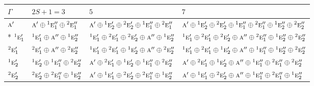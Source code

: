 \documentclass[10pt,a4paper]{article}
\numberwithin{equation}{section}
\newcommand{\irr}[1]{\text{\normalfont\scshape #1}}
\newcommand{\conjpair}[1]{{}^{#1}}
\begin{document}
{\small\setlength{\tabcolsep}{3pt}\begin{longtable}{@{}l>{\RaggedRight\arraybackslash}p{}>{\RaggedRight\arraybackslash}p{}>{\RaggedRight\arraybackslash}p{}@{}}\toprule
$\Gamma$ & $2S + 1 = 3$ & $5$ & $7$\\\midrule\endhead
\bottomrule\endfoot\endlastfoot
$\irr{a}'$ & $\irr{a}'\oplus \conjpair{1}\irr{e}_{1}''\oplus \conjpair{2}\irr{e}_{1}''$ & $\irr{a}'\oplus \conjpair{1}\irr{e}_{2}'\oplus \conjpair{2}\irr{e}_{2}'\oplus \conjpair{1}\irr{e}_{1}''\oplus \conjpair{2}\irr{e}_{1}''$ & $\irr{a}'\oplus \conjpair{1}\irr{e}_{2}'\oplus \conjpair{2}\irr{e}_{2}'\oplus \conjpair{1}\irr{e}_{1}''\oplus \conjpair{2}\irr{e}_{1}''\oplus \conjpair{1}\irr{e}_{2}''\oplus \conjpair{2}\irr{e}_{2}''$\\*
$\conjpair{1}\irr{e}_{1}'$ & $\conjpair{1}\irr{e}_{1}'\oplus \irr{a}''\oplus \conjpair{1}\irr{e}_{2}''$ & $\conjpair{1}\irr{e}_{1}'\oplus \conjpair{2}\irr{e}_{1}'\oplus \conjpair{2}\irr{e}_{2}'\oplus \irr{a}''\oplus \conjpair{1}\irr{e}_{2}''$ & $\conjpair{1}\irr{e}_{1}'\oplus \conjpair{2}\irr{e}_{1}'\oplus \conjpair{2}\irr{e}_{2}'\oplus \irr{a}''\oplus \conjpair{2}\irr{e}_{1}''\oplus \conjpair{1}\irr{e}_{2}''\oplus \conjpair{2}\irr{e}_{2}''$\\
$\conjpair{2}\irr{e}_{1}'$ & $\conjpair{2}\irr{e}_{1}'\oplus \irr{a}''\oplus \conjpair{2}\irr{e}_{2}''$ & $\conjpair{1}\irr{e}_{1}'\oplus \conjpair{2}\irr{e}_{1}'\oplus \conjpair{1}\irr{e}_{2}'\oplus \irr{a}''\oplus \conjpair{2}\irr{e}_{2}''$ & $\conjpair{1}\irr{e}_{1}'\oplus \conjpair{2}\irr{e}_{1}'\oplus \conjpair{1}\irr{e}_{2}'\oplus \irr{a}''\oplus \conjpair{1}\irr{e}_{1}''\oplus \conjpair{1}\irr{e}_{2}''\oplus \conjpair{2}\irr{e}_{2}''$\\
$\conjpair{1}\irr{e}_{2}'$ & $\conjpair{1}\irr{e}_{2}'\oplus \conjpair{1}\irr{e}_{1}''\oplus \conjpair{2}\irr{e}_{2}''$ & $\irr{a}'\oplus \conjpair{2}\irr{e}_{1}'\oplus \conjpair{1}\irr{e}_{2}'\oplus \conjpair{1}\irr{e}_{1}''\oplus \conjpair{2}\irr{e}_{2}''$ & $\irr{a}'\oplus \conjpair{2}\irr{e}_{1}'\oplus \conjpair{1}\irr{e}_{2}'\oplus \irr{a}''\oplus \conjpair{1}\irr{e}_{1}''\oplus \conjpair{2}\irr{e}_{1}''\oplus \conjpair{2}\irr{e}_{2}''$\\
$\conjpair{2}\irr{e}_{2}'$ & $\conjpair{2}\irr{e}_{2}'\oplus \conjpair{2}\irr{e}_{1}''\oplus \conjpair{1}\irr{e}_{2}''$ & $\irr{a}'\oplus \conjpair{1}\irr{e}_{1}'\oplus \conjpair{2}\irr{e}_{2}'\oplus \conjpair{2}\irr{e}_{1}''\oplus \conjpair{1}\irr{e}_{2}''$ & $\irr{a}'\oplus \conjpair{1}\irr{e}_{1}'\oplus \conjpair{2}\irr{e}_{2}'\oplus \irr{a}''\oplus \conjpair{1}\irr{e}_{1}''\oplus \conjpair{2}\irr{e}_{1}''\oplus \conjpair{1}\irr{e}_{2}''$\\

\end{longtable}}
\end{document}
